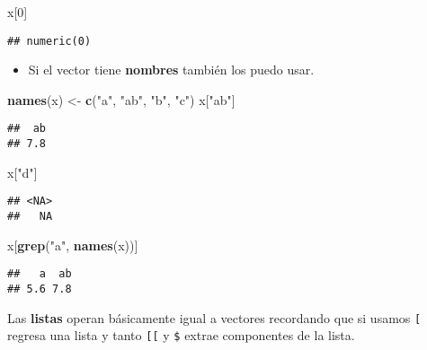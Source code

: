 \documentclass[]{article}
\newenvironment{Shaded}{\begin{snugshade}}{\end{snugshade}}
\newcommand{\KeywordTok}[1]{\textcolor[rgb]{0.13,0.29,0.53}{\textbf{#1}}}
\newcommand{\DecValTok}[1]{\textcolor[rgb]{0.00,0.00,0.81}{#1}}
\newcommand{\StringTok}[1]{\textcolor[rgb]{0.31,0.60,0.02}{#1}}
\newcommand{\NormalTok}[1]{#1}
\providecommand{\tightlist}{%
  \setlength{\itemsep}{0pt}\setlength{\parskip}{0pt}}
\begin{document}
\begin{Shaded}
\begin{Highlighting}[]
\NormalTok{x[}\DecValTok{0}\NormalTok{]}
\end{Highlighting}
\end{Shaded}

\begin{verbatim}
## numeric(0)
\end{verbatim}

\begin{itemize}
\tightlist
\item
  Si el vector tiene \textbf{nombres} también los puedo usar.
\end{itemize}

\begin{Shaded}
\begin{Highlighting}[]
\KeywordTok{names}\NormalTok{(x) <-}\StringTok{ }\KeywordTok{c}\NormalTok{(}\StringTok{"a"}\NormalTok{, }\StringTok{"ab"}\NormalTok{, }\StringTok{"b"}\NormalTok{, }\StringTok{"c"}\NormalTok{)}
\NormalTok{x[}\StringTok{"ab"}\NormalTok{]}
\end{Highlighting}
\end{Shaded}

\begin{verbatim}
##  ab 
## 7.8
\end{verbatim}

\begin{Shaded}
\begin{Highlighting}[]
\NormalTok{x[}\StringTok{"d"}\NormalTok{]}
\end{Highlighting}
\end{Shaded}

\begin{verbatim}
## <NA> 
##   NA
\end{verbatim}

\begin{Shaded}
\begin{Highlighting}[]
\NormalTok{x[}\KeywordTok{grep}\NormalTok{(}\StringTok{"a"}\NormalTok{, }\KeywordTok{names}\NormalTok{(x))]}
\end{Highlighting}
\end{Shaded}

\begin{verbatim}
##   a  ab 
## 5.6 7.8
\end{verbatim}

Las \textbf{listas} operan básicamente igual a vectores recordando que
si usamos \texttt{{[}} regresa una lista y tanto \texttt{{[}{[}} y
\texttt{\$} extrae componentes de la lista.
\end{document}

